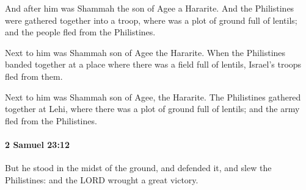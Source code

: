 			\begin{versebox}
					\item[BHS] 
					\item[ASV] And after him was Shammah the son of Agee a Hararite. And the Philistines were gathered together into a troop, where was a plot of ground full of lentils; and the people fled from the Philistines.
					\item[NIV] Next to him was Shammah son of Agee the Hararite. When the Philistines banded together at a place where there was a field full of lentils, Israel’s troops fled from them.
					\item[NRSV] Next to him was Shammah son of Agee, the Hararite. The Philistines gathered together at Lehi, where there was a plot of ground full of lentils; and the army fled from the Philistines.
			\end{versebox}

		\paragraph{2 Samuel 23:12} %
			\label{2SAMUEL-23-12}

			But he stood in the midst of the ground, and defended it, and slew the Philistines: and the LORD wrought a great victory.

